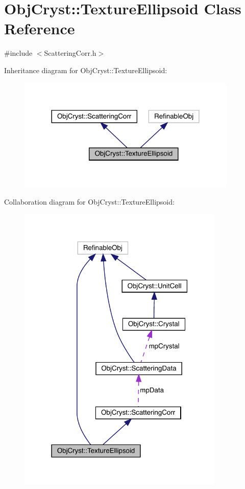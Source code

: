 \hypertarget{class_obj_cryst_1_1_texture_ellipsoid}{}\section{Obj\+Cryst\+::Texture\+Ellipsoid Class Reference}
\label{class_obj_cryst_1_1_texture_ellipsoid}


{\ttfamily \#include $<$Scattering\+Corr.\+h$>$}



Inheritance diagram for Obj\+Cryst\+::Texture\+Ellipsoid\+:
\nopagebreak
\begin{figure}[H]
\begin{center}
\leavevmode
\includegraphics[width=296pt]{class_obj_cryst_1_1_texture_ellipsoid__inherit__graph}
\end{center}
\end{figure}


Collaboration diagram for Obj\+Cryst\+::Texture\+Ellipsoid\+:
\nopagebreak
\begin{figure}[H]
\begin{center}
\leavevmode
\includegraphics[width=279pt]{class_obj_cryst_1_1_texture_ellipsoid__coll__graph}
\end{center}
\end{figure}
